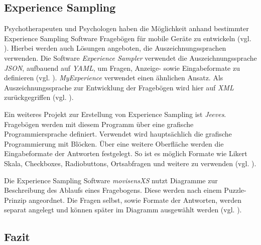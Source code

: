 \subsection{Experience Sampling}
Psychotherapeuten und Psychologen haben die Möglichkeit anhand bestimmter Experience Sampling Software Fragebögen für mobile Geräte zu entwickeln (vgl. \cite{OSFSabri6:online}). Hierbei werden auch Lösungen angeboten, die  Auszeichnungssprachen verwenden. Die Software \emph{Experience Sampler} verwendet die Auszeichnungssprache \emph{JSON}, aufbauend auf \emph{YAML}, um Fragen, Anzeige- sowie Eingabeformate zu definieren (vgl. \cite{OSFSabri6:online}). \emph{MyExperience} verwendet einen ähnlichen Ansatz. Als Auszeichnungssprache zur Entwicklung der Fragebögen wird hier auf \emph{XML} zurückgegriffen (vgl. \cite{theMyExp48:online}).

Ein weiteres Projekt zur Erstellung von Experience Sampling ist \emph{Jeeves}. Fragebögen werden mit diesem Programm über eine grafische Programmiersprache definiert. Verwendet wird hauptsächlich die grafische Programmierung mit Blöcken. Über eine weitere Oberfläche werden die Eingabeformate der Antworten festgelegt. So ist es möglich Formate wie Likert Skala, Checkboxes, Radiobuttons, Ortsabfragen und weitere zu verwenden (vgl. \cite{Rough2017}).

Die Experience Sampling Software \emph{movisensXS} nutzt Diagramme zur Beschreibung des Ablaufs eines Fragebogens. Diese werden nach einem Puzzle-Prinzip angeordnet. Die Fragen selbst, sowie Formate der Antworten, werden separat angelegt und können später im Diagramm ausgewählt werden (vgl. \cite{movisens59:online}).


\subsection{Fazit}

